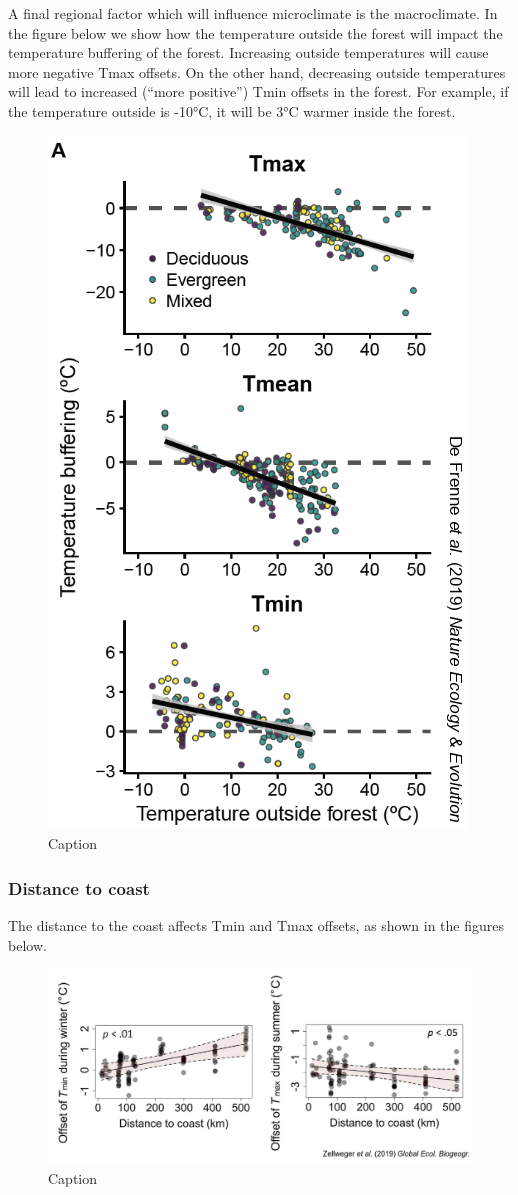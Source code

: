 \documentclass[12pt,oneside]{book}
\begin{document}
A final regional factor which will influence microclimate is the
macroclimate. In the figure below we show how the temperature outside
the forest will impact the temperature buffering of the forest.
Increasing outside temperatures will cause more negative Tmax offsets.
On the other hand, decreasing outside temperatures will lead to
increased (``more positive'') Tmin offsets in the forest. For example,
if the temperature outside is -10°C, it will be 3°C warmer inside the
forest.

\begin{figure}

{\centering \includegraphics[width=0.4\linewidth]{figures/Figure1031} 

}

\caption{Caption}\label{fig:Micro31}
\end{figure}

\subsubsection{Distance to coast}\label{distance-to-coast}

The distance to the coast affects Tmin and Tmax offsets, as shown in the
figures below.

\begin{figure}

{\centering \includegraphics[width=1\linewidth]{figures/Figure1032} 

}

\caption{Caption}\label{fig:Micro32}
\end{figure}
\end{document}
